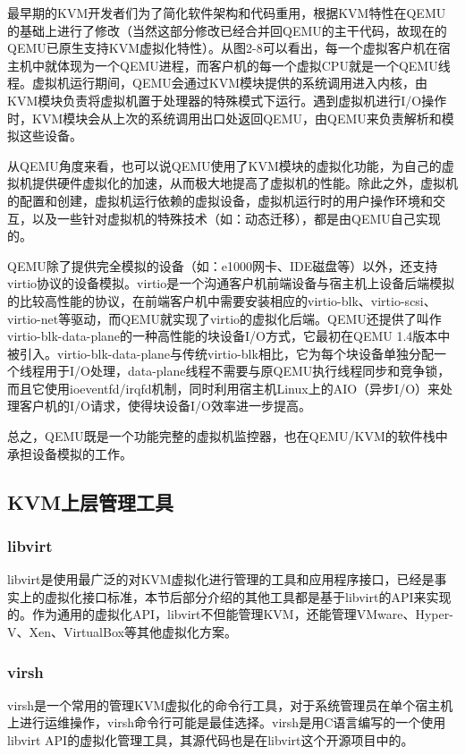 最早期的KVM开发者们为了简化软件架构和代码重用，根据KVM特性在QEMU的基础上进行了修改（当然这部分修改已经合并回QEMU的主干代码，故现在的QEMU已原生支持KVM虚拟化特性）。从图2-8可以看出，每一个虚拟客户机在宿主机中就体现为一个QEMU进程，而客户机的每一个虚拟CPU就是一个QEMU线程。虚拟机运行期间，QEMU会通过KVM模块提供的系统调用进入内核，由KVM模块负责将虚拟机置于处理器的特殊模式下运行。遇到虚拟机进行I/O操作时，KVM模块会从上次的系统调用出口处返回QEMU，由QEMU来负责解析和模拟这些设备。

从QEMU角度来看，也可以说QEMU使用了KVM模块的虚拟化功能，为自己的虚拟机提供硬件虚拟化的加速，从而极大地提高了虚拟机的性能。除此之外，虚拟机的配置和创建，虚拟机运行依赖的虚拟设备，虚拟机运行时的用户操作环境和交互，以及一些针对虚拟机的特殊技术（如：动态迁移），都是由QEMU自己实现的。

QEMU除了提供完全模拟的设备（如：e1000网卡、IDE磁盘等）以外，还支持virtio协议的设备模拟。virtio是一个沟通客户机前端设备与宿主机上设备后端模拟的比较高性能的协议，在前端客户机中需要安装相应的virtio-blk、virtio-scsi、virtio-net等驱动，而QEMU就实现了virtio的虚拟化后端。QEMU还提供了叫作virtio-blk-data-plane的一种高性能的块设备I/O方式，它最初在QEMU 1.4版本中被引入。virtio-blk-data-plane与传统virtio-blk相比，它为每个块设备单独分配一个线程用于I/O处理，data-plane线程不需要与原QEMU执行线程同步和竞争锁，而且它使用ioeventfd/irqfd机制，同时利用宿主机Linux上的AIO（异步I/O）来处理客户机的I/O请求，使得块设备I/O效率进一步提高。

总之，QEMU既是一个功能完整的虚拟机监控器，也在QEMU/KVM的软件栈中承担设备模拟的工作。


\subsection{KVM上层管理工具}

\subsubsection{libvirt}
libvirt是使用最广泛的对KVM虚拟化进行管理的工具和应用程序接口，已经是事实上的虚拟化接口标准，本节后部分介绍的其他工具都是基于libvirt的API来实现的。作为通用的虚拟化API，libvirt不但能管理KVM，还能管理VMware、Hyper-V、Xen、VirtualBox等其他虚拟化方案。

\subsubsection{virsh}
virsh是一个常用的管理KVM虚拟化的命令行工具，对于系统管理员在单个宿主机上进行运维操作，virsh命令行可能是最佳选择。virsh是用C语言编写的一个使用libvirt API的虚拟化管理工具，其源代码也是在libvirt这个开源项目中的。

